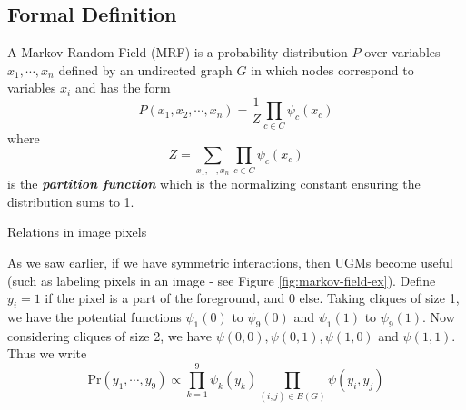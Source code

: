 \subsection{Formal Definition}
\begin{defn}
	A Markov Random Field (MRF) is a probability distribution $P$ over variables $x_1, \cdots, x_n$ defined by an undirected graph $G$ in which nodes correspond to variables $x_i$ and has the form
	\begin{equation}
		P(x_1, x_2, \cdots, x_n) = \dfrac{1}{Z}\prod_{c \in C} \psi_c(x_c)
	\end{equation}
	where 
	\begin{equation}
		Z = \sum_{x_1, \cdots, x_n}\prod_{c \in C} \psi_c (x_c)
	\end{equation}
	is the \textbf{\textit{partition function}} which is the normalizing constant ensuring the distribution sums to 1.
\end{defn}
\begin{marginfigure}
\centering
{}
\caption{Relations in image pixels}
\label{fig:markov-field-ex}	
\end{marginfigure}
As we saw earlier, if we have symmetric interactions, then UGMs become useful (such as labeling pixels in an image - see Figure \ref{fig:markov-field-ex}). Define $y_i = 1$ if the pixel is a part of the foreground, and 0 else. Taking cliques of size 1, we have the potential functions $\psi_1(0)$ to $\psi_9(0)$ and $\psi_1(1)$ to $\psi_9(1)$. Now considering cliques of size 2, we have $\psi(0,0), \psi(0, 1), \psi(1, 0)$ and $\psi(1,1)$. Thus we write
\begin{equation}
\text{Pr}(y_1, \cdots, y_9) \propto \prod_{k=1}^9 \psi_k(y_k) \prod_{(i,j) \in E(G)}\psi(y_i, y_j)
\end{equation}
